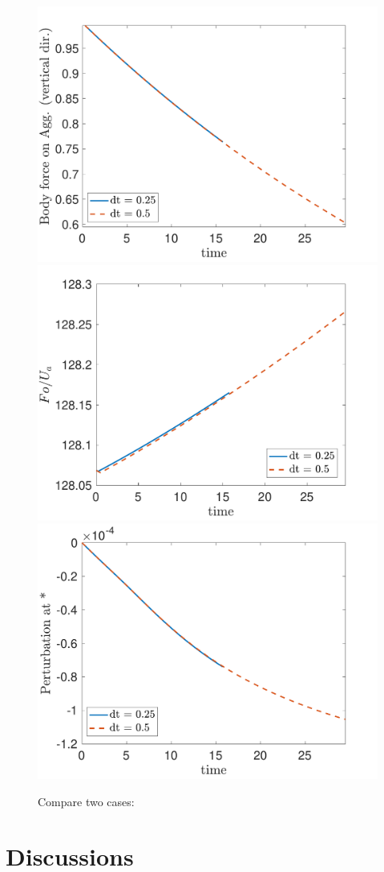 \begin{figure}[ht]
\begin{center}
		\includegraphics[scale=0.33]{./figures/fig_NC50_compare_dt_Fo3_all}
		\includegraphics[scale=0.33]{./figures/fig_NC50_compare_dt_UaFo3_ratio}
		\includegraphics[scale=0.33]{./figures/fig_NC50_compare_dt_C_all}
	\caption{Compare two cases: }
	\label{fig_NC50_compare}
\end{center}
\end{figure}
\section{Discussions}